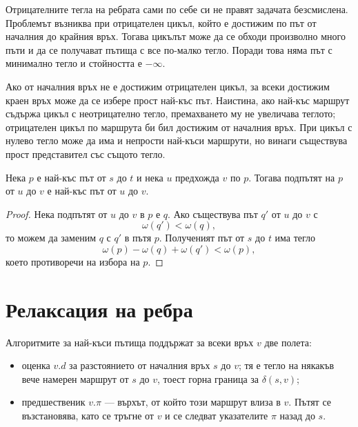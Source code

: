 Отрицателните тегла на ребрата сами по себе си не правят задачата безсмислена. Проблемът възниква при отрицателен цикъл, който е достижим по път от началния до крайния връх. Тогава цикълът може да се обходи произволно много пъти и да се получават пътища с все по-малко тегло. Поради това няма път с минимално тегло и стойността е $-\infty$.

\begin{remark}
Ако от началния връх не е достижим отрицателен цикъл, за всеки достижим краен връх може да се избере прост най-къс път. Наистина, ако най-къс маршрут съдържа цикъл с неотрицателно тегло, премахването му не увеличава теглото; отрицателен цикъл по маршрута би бил достижим от началния връх. При цикъл с нулево тегло може да има и непрости най-къси маршрути, но винаги съществува прост представител със същото тегло.
\end{remark}

\begin{thm}
Нека $p$ е най-къс път от $s$ до $t$ и нека $u$ предхожда $v$ по $p$. Тогава подпътят на $p$ от $u$ до $v$ е най-къс път от $u$ до $v$.
\end{thm}

\begin{proof}
Нека подпътят от $u$ до $v$ в $p$ е $q$. Ако съществува път $q'$ от $u$ до $v$ с
\[
\omega(q')<\omega(q),
\]
то можем да заменим $q$ с $q'$ в пътя $p$. Полученият път от $s$ до $t$ има тегло
\[
\omega(p)-\omega(q)+\omega(q')<\omega(p),
\]
което противоречи на избора на $p$.
\end{proof}

\section{Релаксация на ребра}\label{s:8.2}

Алгоритмите за най-къси пътища поддържат за всеки връх $v$ две полета:

\begin{itemize}
\item оценка $v.d$ за разстоянието от началния връх $s$ до $v$; тя е тегло на някакъв вече намерен маршрут от $s$ до $v$, тоест горна граница за $\delta(s,v)$;
\item предшественик $v.\pi$ --- върхът, от който този маршрут влиза в $v$. Пътят се възстановява, като се тръгне от $v$ и се следват указателите $\pi$ назад до $s$.
\end{itemize}

